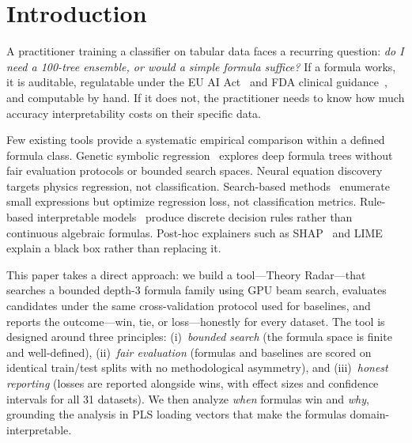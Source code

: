 \documentclass[journal]{IEEEtran}
\begin{document}
\section{Introduction}

A practitioner training a classifier on tabular data faces a
recurring question: \emph{do I need a 100-tree ensemble, or would a
simple formula suffice?}  If a formula works, it is auditable,
regulatable under the EU AI Act~\cite{euaiact2024} and FDA clinical
guidance~\cite{fda2022clinical}, and computable by hand.  If it does
not, the practitioner needs to know how much accuracy
interpretability costs on their specific data.

Few existing tools provide a systematic empirical comparison within a
defined formula class.  Genetic symbolic
regression~\cite{schmidt2009distilling,cranmer2023interpretable}
explores deep formula trees without fair evaluation protocols or
bounded search spaces.  Neural equation
discovery~\cite{udrescu2020ai} targets physics regression, not
classification.  Search-based
methods~\cite{kommenda2020search} enumerate small expressions but
optimize regression loss, not classification metrics.  Rule-based
interpretable models~\cite{breiman1984cart,letham2015interpretable,yang2017scalable}
produce discrete decision rules rather than continuous algebraic
formulas.  Post-hoc explainers such as
SHAP~\cite{lundberg2017unified} and LIME~\cite{ribeiro2016should}
explain a black box rather than replacing it.

This paper takes a direct approach: we build a tool---Theory
Radar---that searches a bounded depth-3 formula family using GPU beam search, evaluates
candidates under the same cross-validation protocol used for
baselines, and reports the outcome---win, tie, or loss---honestly
for every dataset.  The tool is designed around three principles:
(i)~\emph{bounded search} (the formula space is finite and
well-defined), (ii)~\emph{fair evaluation} (formulas and baselines
are scored on identical train/test splits with no methodological
asymmetry), and (iii)~\emph{honest reporting} (losses are reported
alongside wins, with effect sizes and confidence intervals for all
31 datasets).  We then analyze \emph{when} formulas win and
\emph{why}, grounding the analysis in PLS loading vectors that make
the formulas domain-interpretable.
\end{document}
